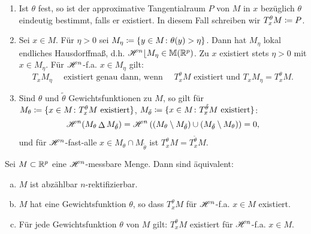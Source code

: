 \documentclass[a4paper,twoside,DIV15,BCOR12mm]{scrbook}
\newcommand{\HM}{\H}
\newcommand{\MR}{\lfloor}
\begin{document}
\begin{bemerkung}
\begin{enumerate}[(1)]
\item Ist \(\theta\) fest, so ist der approximative Tangentialraum \(P\) von \(M\) in \(x\) bezüglich \(\theta\) eindeutig bestimmt, falls er existiert. In diesem Fall schreiben wir \(T_x^\theta M \da P\).
\item Sei \(x\in M\). Für \(\eta>0\) sei \(M_\eta \da \{y\in M \colon \theta(y) > \eta\}\). Dann hat \(M_\eta\) lokal endliches Hausdorffmaß, d.h. \(\HM^n\MR M_\eta \in \mathbb M(\MdR^p)\). Zu \(x\) existiert stets \(\eta>0\) mit \(x \in M_\eta\). Für \(\HM^n\)-f.a. \(x\in M_\eta\) gilt:
\[
T_x M_\eta \quad \text{ existiert genau dann, wenn } \quad T_x^\theta M \text{ existiert und } T_x M_\eta = T_x^\theta M.
\]
\item Sind \(\theta\) und \(\tilde\theta\) Gewichtsfunktionen zu \(M\), so gilt für \(M_\theta \da \{x\in M \colon T_x^\theta M \text{ existiert}\}\), \(M_{\tilde\theta} \da \{x\in M \colon T_x^{\tilde\theta} M 
\text{ existiert}\}\):
\[
\HM^n(M_\theta \mathop\Delta M_{\tilde\theta}) = \HM^n\left( (M_\theta \setminus M_{\tilde\theta}) \cup (M_{\tilde\theta} \setminus M_\theta) \right) = 0,
\]
und für \(\HM^n\)-fast-alle \(x \in M_\theta \cap M_{\tilde\theta}\) ist \(T_x^\theta M = T_x^{\tilde\theta}M\).
\end{enumerate}
\end{bemerkung}

\begin{satz}\label{satz:3.24}
Sei \(M \subset \mathbb{R}^p\) eine \(\HM^n\)-messbare Menge. Dann sind äquivalent:
\begin{enumerate}[(a)]
\item \(M\) ist abzählbar \(n\)-rektifizierbar.
\item \(M\) hat eine Gewichtsfunktion \(\theta\), so dass \(T_x^\theta M\) für \(\HM^n\)-f.a. \(x \in M\) existiert.
\item Für jede Gewichtsfunktion \(\theta\) von \(M\) gilt: \(T_x^\theta M\) existiert für \(\HM^n\)-f.a. \(x\in M\).
\end{enumerate}
\end{satz}
\end{document}

